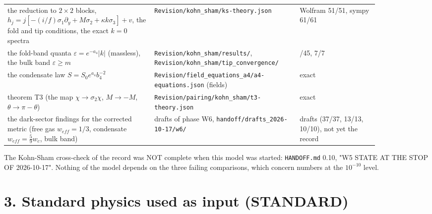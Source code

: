 \documentclass[11pt]{article}
\begin{document}
\begin{longtable}{>{\raggedright\arraybackslash}p{0.357\linewidth}>{\raggedright\arraybackslash}p{0.320\linewidth}>{\raggedright\arraybackslash}p{0.192\linewidth}}
the reduction to $2\times2$ blocks, $h_j = j[-(i/f)\sigma_1\partial_y + M\sigma_2 + \kappa k\sigma_3] + v$, the fold and tip conditions, the exact $k = 0$ spectra & \texttt{Revision/\allowbreak{}kohn\_\allowbreak{}sham/\allowbreak{}ks-{}\allowbreak{}theory.\allowbreak{}json} & Wolfram 51/51, sympy 61/61 \\
the fold-band quanta $\varepsilon = e^{-a_4}|k|$ (massless), the bulk band $\varepsilon \geq m$ & \texttt{Revision/\allowbreak{}kohn\_\allowbreak{}sham/\allowbreak{}results/\allowbreak{}}, \texttt{Revision/\allowbreak{}kohn\_\allowbreak{}sham/\allowbreak{}tip\_\allowbreak{}convergence/\allowbreak{}} & 45/45, 7/7 \\
the condensate law $S = S_0e^{a_4}b_4^{-2}$ & \texttt{Revision/\allowbreak{}field\_\allowbreak{}equations\_\allowbreak{}a4/\allowbreak{}a4-{}\allowbreak{}equations.\allowbreak{}json} (fields) & exact \\
theorem T3 (the map $\chi \to \sigma_2\chi$, $M \to -M$, $\theta \to \pi - \theta$) & \texttt{Revision/\allowbreak{}pairing/\allowbreak{}kohn\_\allowbreak{}sham/\allowbreak{}t3-{}\allowbreak{}theory.\allowbreak{}json} & exact \\
the dark-sector findings for the corrected metric (free gas $w_{eff} = 1/3$, condensate $w_{eff} = \frac59 w_c$, bulk band) & drafts of phase W6, \texttt{handoff/\allowbreak{}drafts\_\allowbreak{}2026-{}\allowbreak{}10-{}\allowbreak{}17/\allowbreak{}w6/\allowbreak{}} & drafts (37/37, 13/13, 10/10), not yet the record \\
\bottomrule
\end{longtable}

The Kohn-Sham cross-check of the record was NOT complete when this model was started: \texttt{HANDOFF.\allowbreak{}md} 0.10, "W5 STATE AT THE STOP OF 2026-10-17". Nothing of the model depends on the three failing comparisons, which concern numbers at the $10^{-10}$ level.

\section*{3. Standard physics used as input (STANDARD)}
\end{document}
